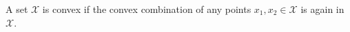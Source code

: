 A set $\mathcal{X}$ is convex if the convex combination of any points $x_1, x_2 \in \mathcal{X}$ is again in $\mathcal{X}$.
